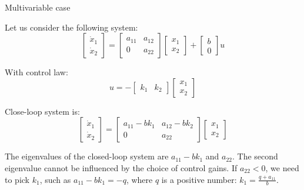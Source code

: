 \documentclass{beamer}
\begin{document}
\begin{frame}{Multivariable case}
	\begin{flushleft}
		
		Let us consider the following system:
		\begin{equation}
			\begin{bmatrix}
				\dot x_1 \\ \dot x_2
			\end{bmatrix} 
		= 
		\begin{bmatrix}
			a_{11} & a_{12} \\ 0 & a_{22}
		\end{bmatrix}
		\begin{bmatrix}
			x_1 \\ x_2
		\end{bmatrix} 
	+ 
		\begin{bmatrix}
			b \\ 0
		\end{bmatrix}
		u
		\end{equation}
		
		With control law:
		\begin{equation}
			u
			= 
			-
			\begin{bmatrix}
				k_1 & k_2
			\end{bmatrix}
			\begin{bmatrix}
				x_1 \\ x_2
			\end{bmatrix} 
		\end{equation}
		
		Close-loop system is:
		\begin{equation}
			\begin{bmatrix}
				\dot x_1 \\ \dot x_2
			\end{bmatrix} 
			= 
			\begin{bmatrix}
				a_{11}-b k_1 & a_{12}-b k_2 \\ 0 & a_{22}
			\end{bmatrix}
			\begin{bmatrix}
				x_1 \\ x_2
			\end{bmatrix} 
		\end{equation}
		
		The eigenvalues of the closed-loop system are $a_{11}-b k_1$ and $a_{22}$.  The second eigenvalue cannot be influenced by the choice of control gains. If $a_{22} < 0$, we need to pick $k_1$, such as  $a_{11}-b k_1 = -q$, where $q$ is a positive number: $k_1 = \frac{q + a_{11}}{b}$.
		
	\end{flushleft}
\end{frame}
\end{document}
